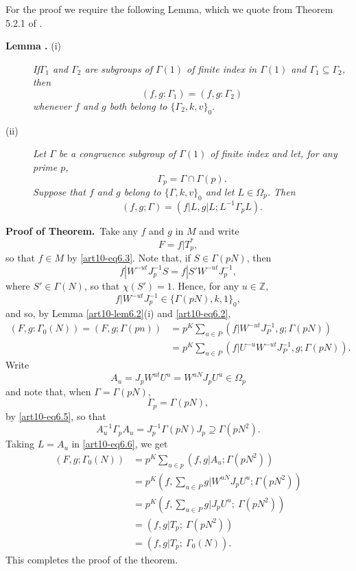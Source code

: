For the proof we require the following Lemma, which we quote from Theorem 5.2.1 of \cite{art10-key9}.

\medskip
\begin{description}
\item[{\bf Lemma .\label{art10-lem6.2}} {\rm (i)}] {\em If\pageoriginale $\Gamma_{1}$ and $\Gamma_{2}$ are subgroups of $\Gamma(1)$ of finite index in $\Gamma(1)$ and $\Gamma_{1}\subseteq \Gamma_{2}$, then}
$$
(f,g:\Gamma_{1})=(f,g:\Gamma_{2})
$$
{\em whenever $f$ and $g$ both belong to $\{\Gamma_{2},k,v\}_{0}$.}

\item[{\rm(ii)}] {\em Let $\Gamma$ be a congruence subgroup of $\Gamma(1)$ of finite index and let, for any prime $p$,}
\begin{equation}
\Gamma_{p}=\Gamma\cap\Gamma(p).\label{art10-eq6.5}
\end{equation}
{\em Suppose that $f$ and $g$ belong to $\{\Gamma,k,v\}_{0}$ and let $L\in \Omega_{p}$. Then}
\begin{equation}
(f,g;\Gamma)=(f|L,g|L;L^{-1}\Gamma_{p}L).\label{art10-eq6.6}
\end{equation}
\end{description}

\noindent
{\bf Proof of Theorem.}~Take any $f$ and $g$ in $M$ and write
$$
F=f|T^{*}_{p},
$$
so that $f\in M$ by \eqref{art10-eq6.3}. Note that, if $S\in \Gamma(pN)$, then
$$
f|W^{-ut}J^{-1}_{p}S=f|S'W^{-ut}J^{-1}_{p},
$$
where $S'\in\Gamma(N)$, so that $\chi(S')=1$. Hence, for any $u\in \mathbb{Z}$,
$$
f|W^{-ut}J^{-1}_{p}\in \{\Gamma(pN),k,1\}_{0},
$$
and so, by Lemma \ref{art10-lem6.2}(i) and \eqref{art10-eq6.2},
\begin{align*}
(F,g:\Gamma_{0}(N))=(F,g;\Gamma(pn)) &= p^{K}\sum\limits_{u\in P}(f|W^{-ut}J^{-1}_{P},g;\Gamma(pN))\\[3pt]
&= p^{K}\sum\limits_{u\in P}(f|U^{-u}W^{-ut}J^{-1}_{P},g;\Gamma(pN)).
\end{align*}
Write
$$
A_{u}=J_{p}W^{ut}U^{u}=W^{uN}J_{p}U^{u}\in \Omega_{p}
$$
and note that, when $\Gamma=\Gamma(pN)$,
$$
\Gamma_{p}=\Gamma(pN),
$$
by \eqref{art10-eq6.5}, so that
$$
A_{u}^{-1}\Gamma_{p}A_{u}=J^{-1}_{p}\Gamma(pN)J_{p}\supseteq \Gamma(pN^{2}).
$$
Taking $L=A_{u}$ in \eqref{art10-eq6.6}, we get
\begin{align*}
(F,g;\Gamma_{0}(N)) &= p^{K}\sum\limits_{u\in p}(f,g|A_{u};\Gamma(pN^{2}))\\
&= p^{K}\left(f,\sum\limits_{u\in P}g|W^{uN}J_{p}U^{u};\Gamma(pN^{2})\right)\\
&= p^{K}\left(f,\sum\limits_{u\in P}g|J_{p}U^{u}; \ \Gamma(pN^{2})\right)\\
&= (f,g|T_{p}; \ \Gamma(pN^{2}))\\[3pt]
&= (f,g|T_{p}; \ \Gamma_{0}(N)).
\end{align*}
This completes the proof of the theorem.

